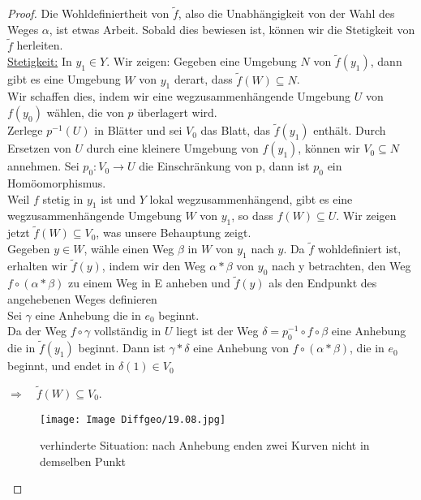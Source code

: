 \documentclass[fleqn, 12pt, letterpaper]{article}
\begin{document}
\begin{proof}
Die Wohldefiniertheit von \( \tilde{f} \), also die Unabhängigkeit von der Wahl des Weges \( \alpha \), ist etwas Arbeit. Sobald dies bewiesen ist, können wir die Stetigkeit von \( \tilde{f} \) herleiten.\\

\underline{Stetigkeit:} In \( y_1 \in Y \). Wir zeigen: Gegeben eine Umgebung \( N \) von \( \tilde{f}(y_1) \), dann gibt es eine Umgebung \( W \) von \( y_1 \) derart, dass \( \tilde{f}(W) \subseteq N \).\\

Wir schaffen dies, indem wir eine wegzusammenhängende Umgebung \( U \) von \( f(y_0) \) wählen, die von \( p \) überlagert wird.\\

Zerlege \( p^{-1}(U) \) in Blätter und sei \( V_0 \) das Blatt, das \( \tilde{f}(y_1) \) enthält. Durch Ersetzen von \( U \) durch eine kleinere Umgebung von \( f(y_1) \), können wir $V_0\subseteq N$ annehmen. Sei $p_0: V_0\to U$ die Einschränkung von p, dann ist $p_0$ ein Homöomorphismus. \\

Weil \( f \) stetig in $y_1$ ist und \( Y \) lokal wegzusammenhängend, gibt es eine wegzusammenhängende Umgebung \( W \) von \( y_1 \), so dass \( f(W) \subseteq U \). Wir zeigen jetzt $\tilde{f}(W)\subseteq V_0$, was unsere Behauptung zeigt.\\

Gegeben \( y \in W \), wähle einen Weg \( \beta \) in \( W \) von \( y_1 \) nach \( y \). Da \( \tilde{f} \) wohldefiniert ist, erhalten wir \( \tilde{f}(y) \), indem wir den Weg $\alpha*\beta$ von $y_0$ nach y betrachten, den Weg $f\circ(\alpha*\beta)$ zu einem Weg in E anheben und $\tilde{f}(y)$ als den Endpunkt des angehebenen Weges definieren\\

Sei \( \gamma \) eine Anhebung die in \( e_0 \) beginnt. \\
Da der Weg \( f\circ\gamma \) vollständig in \( U \) liegt ist der Weg $\delta=p_0^{-1}\circ f\circ \beta$ eine Anhebung die in $\tilde{f}(y_1)$ beginnt. Dann ist \( \gamma*\delta \) eine Anhebung von \( f \circ (\alpha*\beta) \), die in \( e_0 \) beginnt, und endet in $\delta(1)\in V_0$ 

$\Rightarrow \quad \tilde{f}(W)\subseteq V_0 $.\\

  \begin{figure}[H]
    \centering
    \texttt{[image: Image Diffgeo/19.08.jpg]}
	\caption{verhinderte Situation: nach Anhebung enden zwei Kurven nicht in demselben Punkt}
 \end{figure}


\end{proof}
\end{document}
